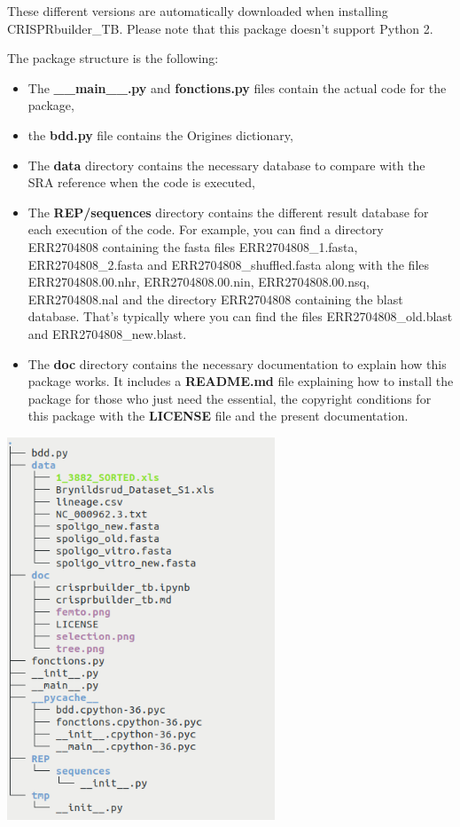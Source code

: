 \documentclass[twoside,a4paper,11pt,frenchb,openany]{report}
\begin{document}
These different versions are automatically downloaded when installing
CRISPRbuilder\_TB. Please note that this package doesn't support Python
2.

    The package structure is the following:

    \begin{itemize}
\item
  The \textbf{\_\_main\_\_.py} and \textbf{fonctions.py} files contain
  the actual code for the package,
\item
  the \textbf{bdd.py} file contains the Origines dictionary,
\item
  The \textbf{data} directory contains the necessary database to compare
  with the SRA reference when the code is executed,
\item
  The \textbf{REP/sequences} directory contains the different result
  database for each execution of the code. For example, you can find a
  directory ERR2704808 containing the fasta files ERR2704808\_1.fasta,
  ERR2704808\_2.fasta and ERR2704808\_shuffled.fasta along with the
  files ERR2704808.00.nhr, ERR2704808.00.nin, ERR2704808.00.nsq,
  ERR2704808.nal and the directory ERR2704808 containing the blast
  database. That's typically where you can find the files
  ERR2704808\_old.blast and ERR2704808\_new.blast.
\item
  The \textbf{doc} directory contains the necessary documentation to
  explain how this package works. It includes a \textbf{README.md} file
  explaining how to install the package for those who just need the
  essential, the copyright conditions for this package with the
  \textbf{LICENSE} file and the present documentation.
\end{itemize}

\includegraphics[width=8cm]{rep_crispr.png}
\end{document}

